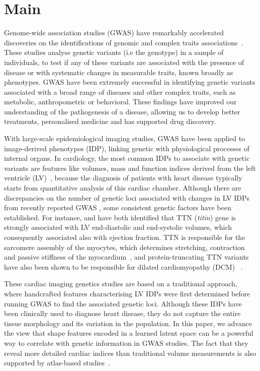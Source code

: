 \section*{Main}
Genome-wide association studies (GWAS) have remarkably accelerated discoveries on the identifications of genomic and complex traits associations~\cite{ref_gwas_review}. These studies analyse genetic variants (i.e the genotype) in a sample of individuals, to test if any of these variants are associated with the presence of disease or with systematic changes in measurable traits, known broadly as phenotypes. GWAS have been extremely successful in identifying genetic variants associated with a broad range of diseases and other complex traits, such as metabolic, anthropometric or behavioral. These findings have improved our understanding of the pathogenesis of a disease, allowing us to develop better treatments, personalised medicine and has supported drug discovery.

With large-scale epidemiological imaging studies, GWAS have been applied to image-derived phenotypes (IDP), linking genetic with physiological processes of internal organs. In cardiology, the most common IDPs to associate with genetic variants are features like volumes, mass and function indices derived from the left ventricle (LV)~\cite{ref_nayaung, ref_biffi}, because the diagnosis of patients with heart disease typically starts from quantitative analysis of this cardiac chamber. Although there are discrepancies on the number of genetic loci associated with changes in LV IDPs from recently reported GWAS \cite{ref_nayaung, ref_pirruccello, ref_biffi}, some consistent genetic factors have been established. 
For instance, \cite{ref_nayaung} and \cite{ref_pirruccello} have both identified that TTN ({\em titin}) gene is strongly associated with LV end-diastolic and end-systolic volumes, which consequently associated also with ejection fraction. TTN is responsible for the sarcomere assembly of the myocytes, which determines stretching, contraction and passive stiffness of the myocardium~\cite{granzier_giant_2004}, and protein-truncating TTN variants have also been shown to be responsible for dilated cardiomyopathy (DCM) ~\cite{tayal_phenotype_2017}.

These cardiac imaging genetics studies are based on a traditional approach, where handcrafted features characterising LV IDPs were first determined before running GWAS to find the associated genetic loci. Although these IDPs have been clinically used to diagnose heart disease, they do not capture the entire tissue morphology and its variation in the population. In this paper, we advance the view that shape features encoded in a learned latent space can be a powerful way to correlate with genetic information in GWAS studies. The fact that they reveal more detailed cardiac indices than traditional volume measurements is also supported by atlas-based studies~\cite{gilbert_independent_2019, medrano-gracia_left_2014}.

